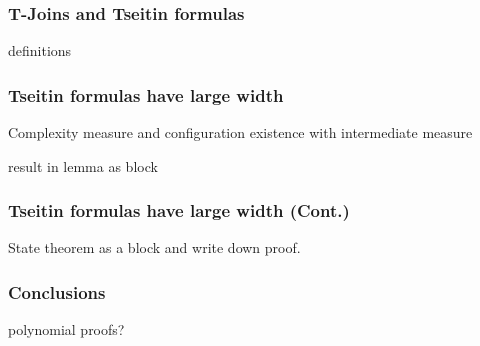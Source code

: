 \documentclass[t,usenames,dvipsnames]{beamer}
\begin{document}
\begin{frame} \frametitle{T-Joins and Tseitin formulas}
	definitions
\end{frame}

\begin{frame} \frametitle{Tseitin formulas have large width}
	Complexity measure and configuration existence with intermediate measure

	result in lemma  as block
\end{frame}

\begin{frame} \frametitle{Tseitin formulas have large width (Cont.)}
	State theorem as a block and write down proof.
\end{frame}

\begin{frame} \frametitle{Conclusions}
polynomial proofs?	
\end{frame}
\end{document}
